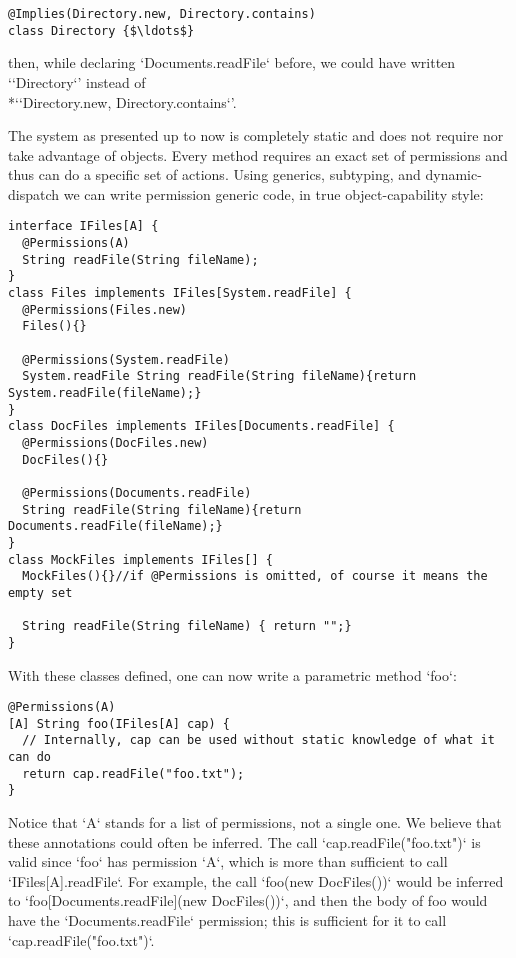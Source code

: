 \documentclass[a4paper,twoside,british,9pt]{extarticle}
\providecommand*{\code}[1]{\Q`#1`}
\begin{document}
\begin{lstlisting}
@Implies(Directory.new, Directory.contains)
class Directory {$\ldots$}
\end{lstlisting}

then, while declaring \code{Documents.readFile} before, we could
have written `\code{Directory}' instead of \\*`\code{Directory.new, Directory.contains}'.

The system as presented up to now is completely static and does not
require nor take advantage of objects. Every method requires an exact
set of permissions and thus can do a specific set of actions. Using
generics, subtyping, and dynamic-dispatch we can write permission generic code,
in true object-capability style:

\begin{lstlisting}
interface IFiles[A] {
  @Permissions(A)
  String readFile(String fileName);
}
class Files implements IFiles[System.readFile] {
  @Permissions(Files.new)
  Files(){}
  
  @Permissions(System.readFile)
  System.readFile String readFile(String fileName){return System.readFile(fileName);}
}
class DocFiles implements IFiles[Documents.readFile] {
  @Permissions(DocFiles.new)
  DocFiles(){}
  
  @Permissions(Documents.readFile)
  String readFile(String fileName){return Documents.readFile(fileName);}
}
class MockFiles implements IFiles[] {
  MockFiles(){}//if @Permissions is omitted, of course it means the empty set 
  
  String readFile(String fileName) { return "";}
}
\end{lstlisting}

 With these classes defined, one can now
write a parametric method \code{foo}:

\begin{lstlisting}
@Permissions(A)
[A] String foo(IFiles[A] cap) {
  // Internally, cap can be used without static knowledge of what it can do
  return cap.readFile("foo.txt");
}
\end{lstlisting}

Notice that \code{A} stands for a list of permissions, not a single
one. 
We believe that these annotations could often be inferred. The call \code{cap.readFile("foo.txt")}
is valid since \code{foo} has permission \code{A}, which is more
than sufficient to call \code{IFiles[A].readFile}.
For example, the call \code{foo(new DocFiles())} would be inferred to \code{foo[Documents.readFile](new DocFiles())}, 
and then the body of foo would have the \code{Documents.readFile} permission; this is sufficient for it to call
\code{cap.readFile("foo.txt")}.
\end{document}
